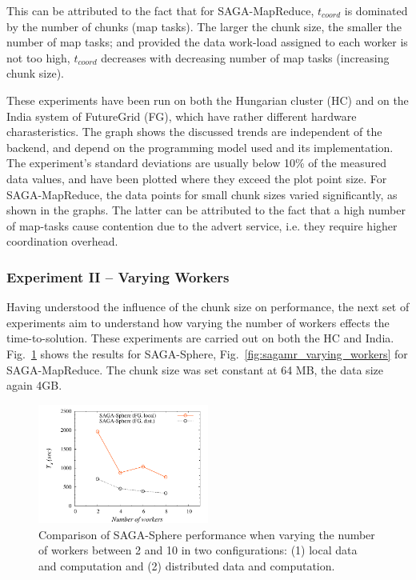 \documentclass[3p,twocolumn]{elsarticle}
\begin{document}
This can be attributed to the fact that for SAGA-MapReduce,
$t_{coord}$ is dominated by the number of chunks (map tasks).
The larger the chunk size, the smaller the number
of map tasks; and provided the data work-load assigned to each worker
is not too high, $t_{coord}$ decreases with decreasing number of map
tasks (increasing chunk size).

These experiments have been run on both the Hungarian cluster (HC) and
on the India system of FutureGrid (FG), which have rather different hardware
charasteristics.  The graph shows the discussed trends are independent
of the backend, and depend on the programming model used and its
implementation. The experiment's standard deviations are usually below
10\% of the measured data values, and have been plotted where they
exceed the plot point size.  For SAGA-MapReduce, the data points for
small chunk sizes varied significantly, as shown in the graphs.
The latter can be attributed to the fact that a high number of map-tasks
cause contention due to the advert service, i.e. they require higher
coordination overhead.


\subsubsection{Experiment II -- Varying Workers}

Having understood the influence of the chunk size on performance, the
next set of experiments aim to understand how varying the number of
workers effects the time-to-solution. These experiments are carried
out on both the HC and India.
Fig.~\ref{fig:sphere_varying_workers} shows the results for
SAGA-Sphere, Fig.~\ref{fig:sagamr_varying_workers} for
SAGA-MapReduce.  The chunk size was set constant at 64 MB, the data
size again 4GB.

\begin{figure}[htb!]
 \includegraphics[width=0.5\textwidth]{figures/sphere_varying_workers.pdf}
 \caption{
   Comparison of SAGA-Sphere performance when varying the number of workers
   between 2 and 10 in two configurations: (1) local data and computation
   and (2) distributed data and computation.
   \label{fig:sphere_varying_workers}
   }
\end{figure}
\end{document}
